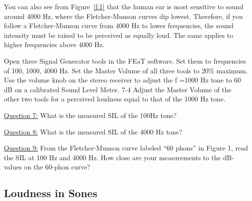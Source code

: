 \documentclass[11pt]{NSF}
\begin{document}
You can also see from Figure~\ref{f:1} that the human ear is most sensitive to
sound around 4000 Hz, where the Fletcher-Munson curves dip lowest.
Therefore, if you follow a Fletcher-Munson curve from 4000 Hz to lower
frequencies, the sound intensity must be raised to be perceived as
equally loud. The same applies to higher frequencies above 4000 Hz.

Open three Signal Generator tools in the FEaT software. Set them to frequencies of 100, 1000,
4000 Hz. Set the Master Volume of all three tools to 20\% maximum. Use the volume knob on
the stereo receiver to adjust the f =1000 Hz tone to 60 dB on a calibrated Sound Level Meter.
7-4
Adjust the Master Volume of the other two tools for a perceived loudness equal to that of the
1000 Hz tone. 

\underline{Question 7:} What is the measured SIL of the 100Hz tone?

\underline{Question 8:} What is the measured SIL of the 4000 Hz tone?

\underline{Question 9:} From the Fletcher-Munson curve labeled “60 phons” in Figure 1, read the SIL at 100 Hz and
4000 Hz. How close are your measurements to the dB-values on the 60-phon curve? 

\subsection{Loudness in Sones}
\end{document}
